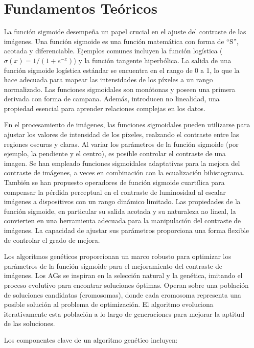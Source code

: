 \section{Fundamentos Teóricos}
La función sigmoide desempeña un papel crucial en el ajuste del contraste de las imágenes. Una función sigmoide es una función matemática con forma de ``S'', acotada y diferenciable. Ejemplos comunes incluyen la función logística ($\sigma(x) = 1/(1 + e^{-x})$) y la función tangente hiperbólica. La salida de una función sigmoide logística estándar se encuentra en el rango de 0 a 1, lo que la hace adecuada para mapear las intensidades de los píxeles a un rango normalizado. Las funciones sigmoidales son monótonas y poseen una primera derivada con forma de campana. Además, introducen no linealidad, una propiedad esencial para aprender relaciones complejas en los datos.

En el procesamiento de imágenes, las funciones sigmoidales pueden utilizarse para ajustar los valores de intensidad de los píxeles, realzando el contraste entre las regiones oscuras y claras. Al variar los parámetros de la función sigmoide (por ejemplo, la pendiente y el centro), es posible controlar el contraste de una imagen. Se han empleado funciones sigmoidales adaptativas para la mejora del contraste de imágenes, a veces en combinación con la ecualización bihistograma. También se han propuesto operadores de función sigmoide cuartílica para compensar la pérdida perceptual en el contraste de luminosidad al escalar imágenes a dispositivos con un rango dinámico limitado. Las propiedades de la función sigmoide, en particular su salida acotada y su naturaleza no lineal, la convierten en una herramienta adecuada para la manipulación del contraste de imágenes. La capacidad de ajustar sus parámetros proporciona una forma flexible de controlar el grado de mejora.

Los algoritmos genéticos proporcionan un marco robusto para optimizar los parámetros de la función sigmoide para el mejoramiento del contraste de imágenes. Los AGs se inspiran en la selección natural y la genética, imitando el proceso evolutivo para encontrar soluciones óptimas. Operan sobre una población de soluciones candidatas (cromosomas), donde cada cromosoma representa una posible solución al problema de optimización. El algoritmo evoluciona iterativamente esta población a lo largo de generaciones para mejorar la aptitud de las soluciones.

Los componentes clave de un algoritmo genético incluyen:

